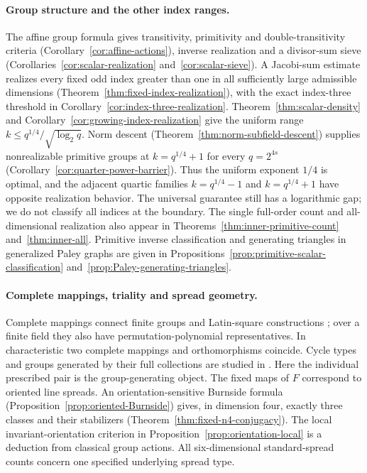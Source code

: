 \documentclass[11pt]{article}
\begin{document}
\paragraph{Group structure and the other index ranges.}
The affine group formula gives transitivity, primitivity and
double-transitivity criteria (Corollary~\ref{cor:affine-actions}),
inverse realization and a divisor-sum sieve
(Corollaries~\ref{cor:scalar-realization} and~\ref{cor:scalar-sieve}).
A Jacobi-sum estimate realizes every fixed odd index greater
than one in all sufficiently large admissible dimensions
(Theorem~\ref{thm:fixed-index-realization}), with the exact
index-three threshold in Corollary~\ref{cor:index-three-realization}.
Theorem~\ref{thm:scalar-density} and
Corollary~\ref{cor:growing-index-realization} give the uniform
range $k\le q^{1/4}/\sqrt{\log_2q}$.
Norm descent (Theorem~\ref{thm:norm-subfield-descent}) supplies
nonrealizable primitive groups at $k=q^{1/4}+1$ for every
$q=2^{4s}$ (Corollary~\ref{cor:quarter-power-barrier}).
Thus the uniform exponent $1/4$ is optimal, and the adjacent
quartic families $k=q^{1/4}-1$ and $k=q^{1/4}+1$ have opposite
realization behavior. The universal guarantee still has a
logarithmic gap; we do not classify all indices at the boundary.
The single full-order count and all-dimensional realization
also appear in Theorems~\ref{thm:inner-primitive-count}
and~\ref{thm:inner-all}. Primitive inverse classification and
generating triangles in generalized Paley graphs are given in
Propositions~\ref{prop:primitive-scalar-classification}
and~\ref{prop:Paley-generating-triangles}.

\paragraph{Complete mappings, triality and spread geometry.}
Complete mappings connect finite groups and Latin-square
constructions \cite{HP55}; over a finite field they also have
permutation-polynomial representatives. In characteristic two
complete mappings and orthomorphisms coincide.
Cycle types and groups generated by their full collections
are studied in \cite{BW21,BW22}. Here the individual prescribed
pair is the group-generating object.
The fixed maps of $F$ correspond to oriented line spreads.
An orientation-sensitive Burnside formula
(Proposition~\ref{prop:oriented-Burnside}) gives, in dimension
four, exactly three classes and their stabilizers
(Theorem~\ref{thm:fixed-n4-conjugacy}).
The local invariant-orientation criterion in
Proposition~\ref{prop:orientation-local} is a deduction from
classical group actions. All six-dimensional standard-spread
counts concern one specified underlying spread type.
\end{document}
